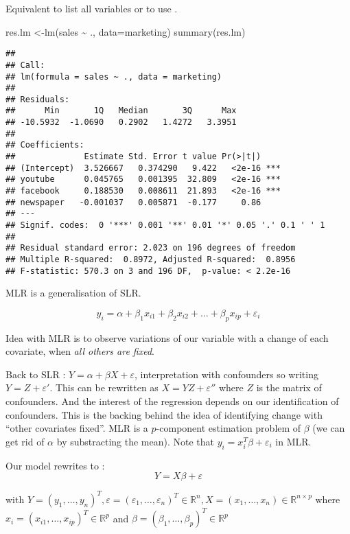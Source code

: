 \documentclass[
]{article}
\newenvironment{Shaded}{\begin{snugshade}}{\end{snugshade}}
\newcommand{\AttributeTok}[1]{\textcolor[rgb]{0.77,0.63,0.00}{#1}}
\newcommand{\FunctionTok}[1]{\textcolor[rgb]{0.00,0.00,0.00}{#1}}
\newcommand{\NormalTok}[1]{#1}
\newcommand{\OtherTok}[1]{\textcolor[rgb]{0.56,0.35,0.01}{#1}}
\newcommand{\SpecialCharTok}[1]{\textcolor[rgb]{0.00,0.00,0.00}{#1}}
\begin{document}
Equivalent to list all variables or to use .

\begin{Shaded}
\begin{Highlighting}[]
\NormalTok{res.lm }\OtherTok{\textless{}{-}}\FunctionTok{lm}\NormalTok{(sales }\SpecialCharTok{\textasciitilde{}}\NormalTok{ ., }\AttributeTok{data=}\NormalTok{marketing) }
\FunctionTok{summary}\NormalTok{(res.lm)}
\end{Highlighting}
\end{Shaded}

\begin{verbatim}
## 
## Call:
## lm(formula = sales ~ ., data = marketing)
## 
## Residuals:
##      Min       1Q   Median       3Q      Max 
## -10.5932  -1.0690   0.2902   1.4272   3.3951 
## 
## Coefficients:
##              Estimate Std. Error t value Pr(>|t|)    
## (Intercept)  3.526667   0.374290   9.422   <2e-16 ***
## youtube      0.045765   0.001395  32.809   <2e-16 ***
## facebook     0.188530   0.008611  21.893   <2e-16 ***
## newspaper   -0.001037   0.005871  -0.177     0.86    
## ---
## Signif. codes:  0 '***' 0.001 '**' 0.01 '*' 0.05 '.' 0.1 ' ' 1
## 
## Residual standard error: 2.023 on 196 degrees of freedom
## Multiple R-squared:  0.8972, Adjusted R-squared:  0.8956 
## F-statistic: 570.3 on 3 and 196 DF,  p-value: < 2.2e-16
\end{verbatim}

MLR is a generalisation of SLR.

\[y_i=\alpha+\beta_1 x_{i1}+\beta_2 x_{i2}+\dots+\beta_p x_{ip}+\varepsilon_i\]

Idea with MLR is to observe variations of our variable with a change of
each covariate, when \emph{all others are fixed}.

Back to SLR : \(Y=\alpha+\beta X+\varepsilon\), interpretation with
confounders so writing \(Y=Z+\varepsilon'\). This can be rewritten as
\(X=YZ+\varepsilon''\) where \(Z\) is the matrix of confounders. And the
interest of the regression depends on our identification of confounders.
This is the backing behind the idea of identifying change with ``other
covariates fixed''. MLR is a \(p\)-component estimation problem of
\(\beta\) (we can get rid of \(\alpha\) by substracting the mean). Note
that \(y_i=x_i^T\beta+\varepsilon_i\) in MLR.

Our model rewrites to : \[Y=X\beta+\varepsilon\]

with
\(Y=(y_1,\dots, y_n)^T,\varepsilon=(\varepsilon_1,\dots,\varepsilon_n)^T\in\mathbb{R}^n, X=(x_1,\dots, x_n)\in\mathbb{R}^{n\times p}\)
where \(x_i=(x_{i1},\dots, x_{ip})^T\in\mathbb{R}^p\) and
\(\beta=(\beta_1,\dots,\beta_p)^T\in\mathbb{R}^p\)
\end{document}
